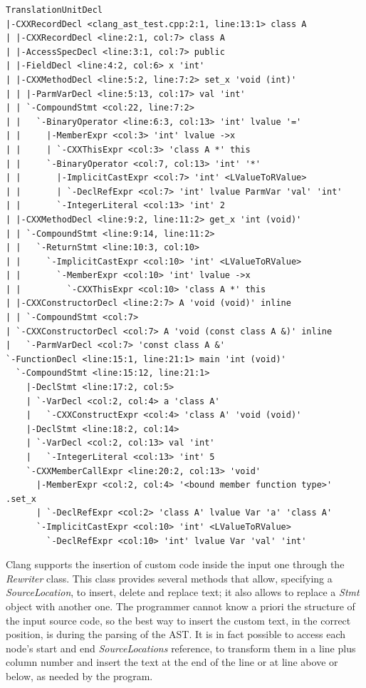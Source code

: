 \documentclass[a4paper,11pt,oneside]{book}
\begin{document}
\begin{lstlisting}[language=AST, caption=Clang AST of the simple code., label=ast]
TranslationUnitDecl
|-CXXRecordDecl <clang_ast_test.cpp:2:1, line:13:1> class A
| |-CXXRecordDecl <line:2:1, col:7> class A
| |-AccessSpecDecl <line:3:1, col:7> public
| |-FieldDecl <line:4:2, col:6> x 'int'
| |-CXXMethodDecl <line:5:2, line:7:2> set_x 'void (int)'
| | |-ParmVarDecl <line:5:13, col:17> val 'int'
| | `-CompoundStmt <col:22, line:7:2>
| |   `-BinaryOperator <line:6:3, col:13> 'int' lvalue '='
| |     |-MemberExpr <col:3> 'int' lvalue ->x
| |     | `-CXXThisExpr <col:3> 'class A *' this
| |     `-BinaryOperator <col:7, col:13> 'int' '*'
| |       |-ImplicitCastExpr <col:7> 'int' <LValueToRValue>
| |       | `-DeclRefExpr <col:7> 'int' lvalue ParmVar 'val' 'int'
| |       `-IntegerLiteral <col:13> 'int' 2
| |-CXXMethodDecl <line:9:2, line:11:2> get_x 'int (void)'
| | `-CompoundStmt <line:9:14, line:11:2>
| |   `-ReturnStmt <line:10:3, col:10>
| |     `-ImplicitCastExpr <col:10> 'int' <LValueToRValue>
| |       `-MemberExpr <col:10> 'int' lvalue ->x
| |         `-CXXThisExpr <col:10> 'class A *' this
| |-CXXConstructorDecl <line:2:7> A 'void (void)' inline
| | `-CompoundStmt <col:7>
| `-CXXConstructorDecl <col:7> A 'void (const class A &)' inline
|   `-ParmVarDecl <col:7> 'const class A &'
`-FunctionDecl <line:15:1, line:21:1> main 'int (void)'
  `-CompoundStmt <line:15:12, line:21:1>
    |-DeclStmt <line:17:2, col:5>
    | `-VarDecl <col:2, col:4> a 'class A'
    |   `-CXXConstructExpr <col:4> 'class A' 'void (void)'
    |-DeclStmt <line:18:2, col:14>
    | `-VarDecl <col:2, col:13> val 'int'
    |   `-IntegerLiteral <col:13> 'int' 5
    `-CXXMemberCallExpr <line:20:2, col:13> 'void'
      |-MemberExpr <col:2, col:4> '<bound member function type>' .set_x
      | `-DeclRefExpr <col:2> 'class A' lvalue Var 'a' 'class A'
      `-ImplicitCastExpr <col:10> 'int' <LValueToRValue>
        `-DeclRefExpr <col:10> 'int' lvalue Var 'val' 'int'
\end{lstlisting}


Clang supports the insertion of custom code inside the input one through the \emph{Rewriter} class. This class provides several methods that allow, specifying a \emph{SourceLocation}, to insert, delete and replace text; it also allows to replace a \emph{Stmt} object with another one. The programmer cannot know a priori the structure of the input source code, so the best way to insert the custom text, in the correct position, is during the parsing of the AST. It is in fact possible to access each node’s start and end \emph{SourceLocations} reference, to transform them in a line plus column number and insert the text at the end of the line or at line above or below, as needed by the program. 
\end{document}
